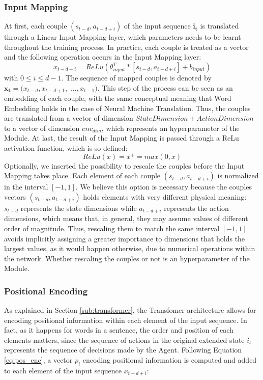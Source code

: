             \subsubsection{Input Mapping}
                At first, each couple $(s_{t-d}, a_{t-d+i})$ of the input sequence $\mathbf{i_t}$ is translated through a Linear Input Mapping layer, which parameters needs to be learnt throughout the training process. In practice, each couple is treated as a vector and the following operation occurs in the Input Mapping layer:
                \[ x_{t-d+i} = ReLu \left( \theta_{input}^{T} * [s_{t-d}, a_{t-d+i}] + b_{input} \right)\]
                with $0 \leq i \leq d - 1$. The sequence of mapped couples is denoted by $\mathbf{x_t} = (x_{t-d}, x_{t-d+1}, $ $..., x_{t-1})$. This step of the process can be seen as an embedding of each couple, with the same conceptual meaning that Word Embedding holds in the case of Neural Machine Translation. Thus, the couples are translated from a vector of dimension $State Dimension + Action Dimension$ to a vector of dimension $enc_{dim}$, which represents an hyperparameter of the Module. At last, the result of the Input Mapping is passed through a ReLu activation function, which is so defined:
                \[ ReLu(x) = x^{+} = max(0, x) \]
                \noindent
                Optionally, we inserted the possibility to rescale the couples before the Input Mapping takes place. Each element of each couple $(s_{t-d}, a_{t-d+i})$ is normalized in the interval $[-1,1]$. We believe this option is necessary because the couples vectors $(s_{t-d}, a_{t-d+i})$ holds elements with very different physical meaning: $s_{t-d}$ represents the state dimensions while $a_{t-d+i}$ represents the action dimensions, which means that, in general, they may assume values of different order of magnitude. Thus, rescaling them to match the same interval $[-1,1]$ avoids implicitly assigning a greater importance to dimensions that holds the largest values, as it would happen otherwise, due to numerical operations within the network. Whether rescaling the couples or not is an hyperparameter of the Module.
                
            \subsubsection{Positional Encoding}
                As explained in Section \ref{sub:transformer}, the Transfomer architecture allows for encoding positional information within each element of the input sequence. In fact, as it happens for words in a sentence, the order and position of each elements matters, since the sequence of actions in the original extended state $i_t$ represents the sequence of decisions made by the Agent. Following Equation \ref{eq:pos_enc}, a vector $p_i$ encoding positional information is computed and added to each element of the input sequence $x_{t-d+i}$:
                
